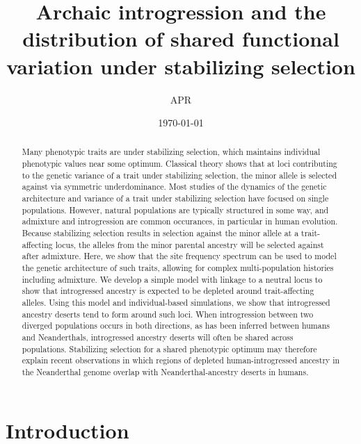 \documentclass{article}
\title{Archaic introgression and the distribution
of shared functional variation under stabilizing selection}
\author{APR}
\date{\today}
\begin{document}
\maketitle    


\begin{abstract}
    
    Many phenotypic traits are under stabilizing selection, which maintains
    individual phenotypic values near some optimum. Classical theory shows that
    at loci contributing to the genetic variance of a trait under stabilizing
    selection, the minor allele is selected against via symmetric
    underdominance. Most studies of the dynamics of the genetic architecture
    and variance of a trait under stabilizing selection have focused on single
    populations. However, natural populations are typically structured in some
    way, and admixture and introgression are common occurances, in particular
    in human evolution. Because stabilizing selection results in selection
    against the minor allele at a trait-affecting locus, the alleles from the
    minor parental ancestry will be selected against after admixture. Here, we
    show that the site frequency spectrum can be used to model the genetic
    architecture of such traits, allowing for complex multi-population
    histories including admixture. We develop a simple model with linkage to a
    neutral locus to show that introgressed ancestry is expected to be depleted
    around trait-affecting alleles. Using this model and individual-based
    simulations, we show that introgressed ancestry deserts tend to form around
    such loci. When introgression between two diverged populations occurs in
    both directions, as has been inferred between humans and Neanderthals,
    introgressed ancestry deserts will often be shared across populations.
    Stabilizing selection for a shared phenotypic optimum may therefore explain
    recent observations in which regions of depleted human-introgressed
    ancestry in the Neanderthal genome overlap with Neanderthal-ancestry
    deserts in humans.

\end{abstract}

\onehalfspacing

\section*{Introduction}
\end{document}

